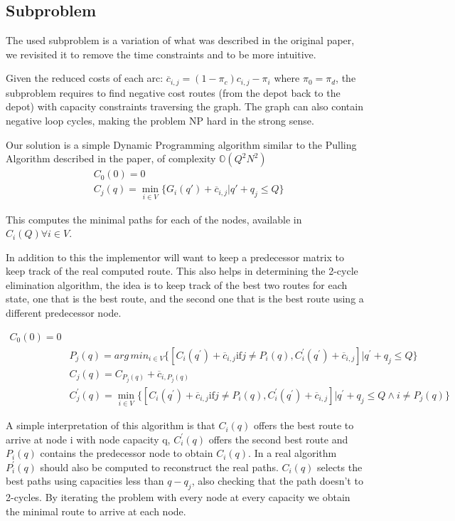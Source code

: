 \subsection{Subproblem}
The used subproblem is a variation of what was described in the original paper, we revisited it to remove the time constraints and to be more intuitive.

Given the reduced costs of each arc: $\overline{c}_{i,j} = (1 - \pi_c)c_{i,j} - \pi_i$ where $\pi_0 = \pi_d$, the subproblem requires to find negative cost routes (from the depot back to the depot) with capacity constraints traversing the graph. The graph can also contain negative loop cycles, making the problem NP hard in the strong sense.

Our solution is a simple Dynamic Programming algorithm similar to the Pulling Algorithm described in the paper, of complexity $\mathbb{O}(Q^2N^2)$
\begin{align*}
  &C_0(0) = 0 \\
  &C_j(q) = \min_{i \in V} \{G_i(q\prime) + \overline{c}_{i,j} | q\prime + q_j \leq Q\}
\end{align*}

This computes the minimal paths for each of the nodes, available in $C_i(Q) \forall i \in V$.

In addition to this the implementor will want to keep a predecessor matrix to keep track of the real computed route. This also helps in determining the 2-cycle elimination algorithm, the idea is to keep track of the best two routes for each state, one that is the best route, and the second one that is the best route using a different predecessor node.

\begin{align*}
  C_0(0) = 0 \\
  &P_j(q) = arg\,min_{i \in V} \{
    [C_i(q^\prime) + \overline{c}_{i,j} \text{if} j \neq P_i(q), C^\prime_i(q^\prime) + \overline{c}_{i,j}] |
    q^\prime + q_j \leq Q
  \} \\
  &C_j(q) = C_{P_j(q)} + \overline{c}_{i,P_j(q)} \\
  &C^\prime_j(q) = \min_{i \in V} \{
    [C_i(q^\prime) + \overline{c}_{i,j} \text{if} j \neq P_i(q), C^\prime_i(q^\prime) + \overline{c}_{i,j}] |
    q^\prime + q_j \leq Q \land i \neq P_j(q)
  \}
\end{align*}

A simple interpretation of this algorithm is that $C_i(q)$ offers the best route to arrive at node i with node capacity q, $C^\prime_i(q)$ offers the second best route and $P_i(q)$ contains the predecessor node to obtain $C_i(q)$. In a real algorithm $P^\prime_i(q)$ should also be computed to reconstruct the real paths. $C_i(q)$ selects the best paths using capacities less than $q - q_j$, also checking that the path doesn't to 2-cycles. By iterating the problem with every node at every capacity we obtain the minimal route to arrive at each node.

